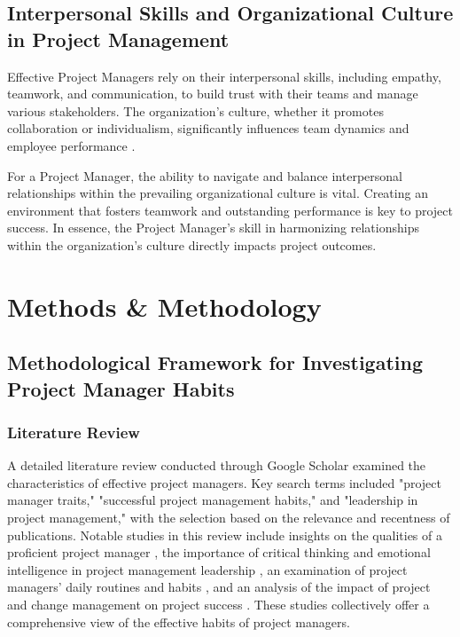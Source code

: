 \documentclass{article}
\begin{document}
\subsection{Interpersonal Skills and Organizational Culture in Project Management}

Effective Project Managers rely on their interpersonal skills, including empathy, teamwork, and communication, to build trust with their teams and manage various stakeholders. The organization's culture, whether it promotes collaboration or individualism, significantly influences team dynamics and employee performance \cite{nusari2018impact}.

For a Project Manager, the ability to navigate and balance interpersonal relationships within the prevailing organizational culture is vital. Creating an environment that fosters teamwork and outstanding performance is key to project success. In essence, the Project Manager's skill in harmonizing relationships within the organization's culture directly impacts project outcomes.


\section{Methods \& Methodology}

\subsection{Methodological Framework for Investigating Project Manager Habits}

\subsubsection{Literature Review}

A detailed literature review conducted through Google Scholar examined the characteristics of effective project managers. Key search terms included "project manager traits," "successful project management habits," and "leadership in project management," with the selection based on the relevance and recentness of publications. Notable studies in this review include insights on the qualities of a proficient project manager \cite{bredillet2015good}, the importance of critical thinking and emotional intelligence in project management leadership \cite{muller2010leadership}, an examination of project managers' daily routines and habits \cite{sigurdhssonpatterns}, and an analysis of the impact of project and change management on project success \cite{pollack2016project}. These studies collectively offer a comprehensive view of the effective habits of project managers.
\end{document}
